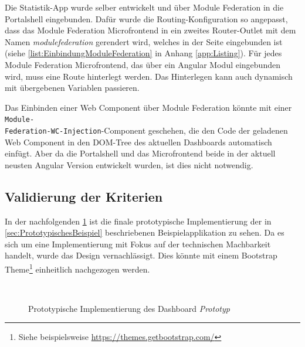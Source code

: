Die Statistik-App wurde selber entwickelt und über Module Federation in die Portalshell eingebunden. Dafür wurde die Routing-Konfiguration so angepasst, dass das Module Federation Microfrontend in ein zweites Router-Outlet mit dem Namen \textit{modulefederation} gerendert wird, welches in der Seite eingebunden ist (siehe \cref{list:EinbindungModuleFederation} in Anhang \ref{app:Listing}). Für jedes Module Federation Microfrontend, das über ein Angular Modul eingebunden wird, muss eine Route hinterlegt werden. Das Hinterlegen kann auch dynamisch mit übergebenen Variablen passieren.

Das Einbinden einer Web Component über Module Federation könnte mit einer \texttt{Module-\\Federation-WC-Injection}-Component geschehen, die den Code der geladenen Web Component in den \gls{DOM}-Tree des aktuellen Dashboards automatisch einfügt. Aber da die Portalshell und das Microfrontend beide in der aktuell neusten Angular Version entwickelt wurden, ist dies nicht notwendig.

\subsection{Validierung der Kriterien}\label{sec:ImplementierungValidierungKriterien}

In der nachfolgenden \cref{fig:ImplementierungScreenshot} ist die finale prototypische Implementierung der in \cref{sec:PrototypischesBeispiel} beschriebenen Beispielapplikation zu sehen. Da es sich um eine Implementierung mit Fokus auf der technischen Machbarkeit handelt, wurde das Design vernachlässigt. Dies könnte mit einem Bootstrap Theme\footnote{Siehe beispielsweise \url{https://themes.getbootstrap.com/}} einheitlich nachgezogen werden.

\newpage
\begin{figure}[hbt!]
	\begin{minipage}[t]{1\textwidth}	
		\caption{Prototypische Implementierung des Dashboard \textit{Prototyp}}
		\\ %
		\label{fig:ImplementierungScreenshot}
	\end{minipage}
\end{figure}

